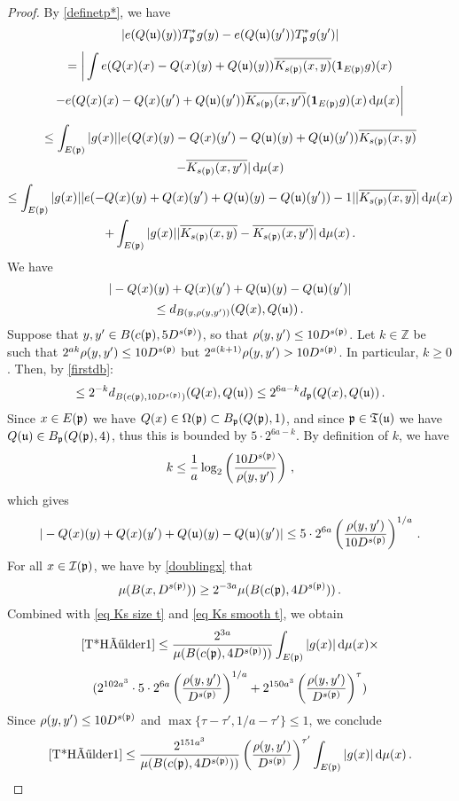 \begin{proof}
    By \eqref{definetp*}, we have
    $$
        |e({Q}(\mathfrak u)(y)) T_{\mathfrak p}^* g(y) - e({Q}(\mathfrak u)(y')) T_{\mathfrak p}^* g(y')|
    $$
    \begin{multline*}
        =\bigg| \int e({Q}(x)(x) - {Q}(x)(y) + Q(\mathfrak u)(y)) \overline{K_{s(\mathfrak p)}(x, y)} (\mathbf{1}_{E(\mathfrak p)} g)(x) \\
        -  e({Q}(x)(x) - {Q}(x)(y') + Q(\mathfrak u)(y')) \overline{K_{s(\mathfrak p)}(x, y')} (\mathbf{1}_{E(\mathfrak p)} g)(x) \, \mathrm{d}\mu(x)\bigg|
    \end{multline*}
    \begin{multline*}
        \leq\int_{E(\mathfrak p)} |g(x)| |e({Q}(x)(y) - {Q}(x)(y') - {Q}(\mathfrak u)(y) + {Q}(\mathfrak u)(y'))\overline{K_{s(\mathfrak p)}(x, y)}\\
        - \overline{K_{s(\mathfrak p)}(x, y')}| \, \mathrm{d}\mu(x)
    \end{multline*}
    \begin{multline}
        \leq\int_{E(\mathfrak p)} |g(x)| |e(-{Q}(x)(y) + {Q}(x)(y') + Q(\mathfrak u)(y) - Q(\mathfrak u)(y')) - 1||\overline{K_{s(\mathfrak p)}(x, y)}|\, \mathrm{d}\mu(x)\\
        + \int_{E(\mathfrak p)} |g(x)| |\overline{K_{s(\mathfrak p)}(x, y)} - \overline{K_{s(\mathfrak p)}(x, y')} |\, \mathrm{d}\mu(x)\,.\label{T*Hölder1}
    \end{multline}
    We have
    $$
        |-{Q}(x)(y) + {Q}(x)(y') + Q(\mathfrak u)(y) - Q(\mathfrak u)(y')|
    $$
    $$
        \le d_{B(y, \rho(y,y'))}({Q}(x), {Q}(\mathfrak u))\,.
    $$
    Suppose that $y, y' \in B(c(\mathfrak p), 5D^{s(\mathfrak p)})$, so that $\rho(y,y') \le 10D^{s(\mathfrak p)}$. Let $k \in \mathbb{Z}$ be such that $2^{ak}\rho(y,y') \le 10D^{s(\mathfrak p)}$ but $2^{a(k+1)} \rho(y,y') > 10D^{s(\mathfrak p)}$. In particular, $k \ge 0$. Then, by \eqref{firstdb}:
    $$
        \le 2^{-k} d_{B(c(\mathfrak p), 10 D^{s(\mathfrak p)})}({Q}(x), {Q}(\mathfrak u)) \le 2^{6a - k} d_{\mathfrak p}({Q}(x), {Q}(\mathfrak u))\,.
    $$
    Since $x \in E(\mathfrak p)$ we have ${Q}(x) \in \Omega(\mathfrak p) \subset B_{\mathfrak p}({Q}(\mathfrak p), 1)$, and since $\mathfrak p \in \mathfrak T(\mathfrak u)$ we have ${Q}(\mathfrak u) \in B_{\mathfrak p}({Q}(\mathfrak p), 4)$, thus this is bounded by $5 \cdot 2^{6a - k}$.
    By definition of $k$, we have
    $$
        k \le \frac{1}{a} \log_2\left(\frac{10 D^{s(\mathfrak p)}}{\rho(y,y')}\right)\,,
    $$
    which gives
    $$
        |-{Q}(x)(y) + {Q}(x)(y') + Q(\mathfrak u)(y) - Q(\mathfrak u)(y')| \le 5 \cdot 2^{6a} \left(\frac{\rho(y,y')}{10 D^{s(\mathfrak p)}}\right)^{1/a}\,.
    $$
    For all $x \in \mathcal{I}(\mathfrak p)$, we have by \eqref{doublingx} that
    $$
        \mu(B(x, D^{s(\mathfrak p)})) \ge 2^{-3a} \mu(B(c(\mathfrak p), 4D^{s(\mathfrak p)}))\,.
    $$
    Combined with \eqref{eq Ks size t} and \eqref{eq Ks smooth t},
    we obtain
    $$
        \eqref{T*Hölder1} \le \frac{2^{3a}}{\mu(B(c(\mathfrak p), 4D^{s(\mathfrak p)}))} \int_{E(\mathfrak p)}|g(x)| \, \mathrm{d}\mu(x) \times
    $$
    $$
        (2^{102a^3} \cdot 5 \cdot 2^{6a} \left(\frac{\rho(y,y')}{ D^{s(\mathfrak p)}}\right)^{1/a} + 2^{150a^3} \left(\frac{\rho(y,y')}{D^{s(\mathfrak p)}}\right)^\tau)
    $$
    Since $\rho(y,y') \le 10 D^{s(\mathfrak p)}$ and $\max\{\tau - \tau', 1/a - \tau'\} \le 1$, we conclude
    $$
        \eqref{T*Hölder1} \le \frac{2^{151a^3}}{\mu(B(c(\mathfrak p), 4D^{s(\mathfrak p)}))} \left(\frac{\rho(y,y')}{D^{s(\mathfrak p)}}\right)^{\tau'} \int_{E(\mathfrak p)}|g(x)| \, \mathrm{d}\mu(x)\,.
    $$


\end{proof}
